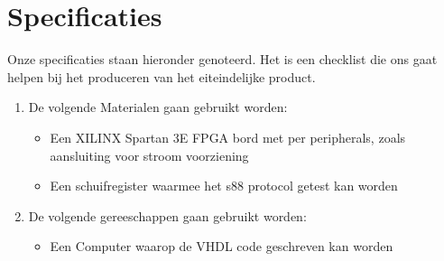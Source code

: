 \chapter{Specificaties}

Onze specificaties staan hieronder genoteerd. Het is een checklist die ons gaat helpen bij het produceren van het eiteindelijke product.

\begin{enumerate}
	\item De volgende Materialen gaan gebruikt worden:
	\begin{itemize}
		\item Een XILINX Spartan 3E FPGA bord met per peripherals, zoals aansluiting voor stroom voorziening
		\item Een schuifregister waarmee het s88 protocol getest kan worden
	\end{itemize}
		\item De volgende gereeschappen gaan gebruikt worden:
		\begin{itemize}
		\item Een Computer waarop de VHDL code geschreven kan worden
		\end{itemize}

	
\end{enumerate}